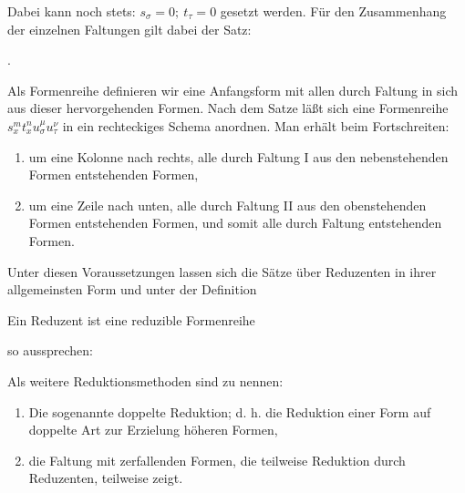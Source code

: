 Dabei kann noch stets: $s_\sigma=0;\ t_\tau=0$ gesetzt werden. Für den Zusammenhang der einzelnen Faltungen gilt dabei der Satz:

.

Als \glqq{}Formenreihe\grqq{} definieren wir eine Anfangsform mit allen durch Faltung in sich aus dieser hervorgehenden Formen. Nach dem Satze läßt sich eine Formenreihe $s_x^m t_x^n u_\sigma^\mu u_\tau^\nu$ in ein rechteckiges Schema anordnen. Man erhält beim Fortschreiten:
\begin{enumerate}
\item um eine Kolonne nach rechts, alle durch Faltung I aus den nebenstehenden Formen entstehenden Formen,
\item um eine Zeile nach unten, alle durch Faltung II aus den obenstehenden Formen entstehenden Formen, und somit alle durch Faltung entstehenden Formen.
\end{enumerate}

Unter diesen Voraussetzungen lassen sich die Sätze über Reduzenten in ihrer allgemeinsten Form und unter der Definition
\begin{center}
\glqq{}Ein Reduzent ist eine reduzible Formenreihe\grqq{}
\end{center}
so aussprechen:

\begin{center}
\end{center}

Als weitere Reduktionsmethoden sind zu nennen:
\begin{enumerate}
\item Die sogenannte \glqq{}doppelte Reduktion\grqq{}; d. h. die Reduktion einer Form auf doppelte Art zur Erzielung  höheren Formen,
\item die \glqq{}Faltung mit zerfallenden Formen\grqq{}, die teilweise  Reduktion durch Reduzenten, teilweise  zeigt.
\end{enumerate}
